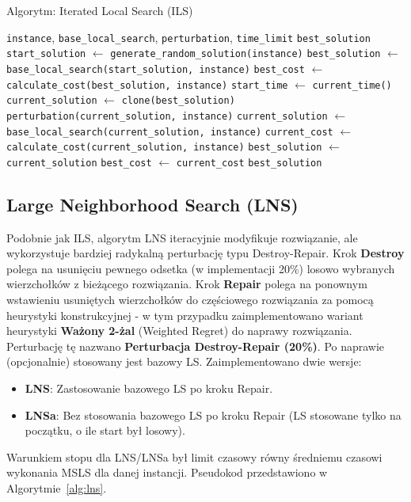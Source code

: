 \documentclass[12pt,a4paper]{article}
\begin{document}
\begin{algorithm}[H]
\caption{Algorytm: Iterated Local Search (ILS)}
\label{alg:ils}
\begin{algorithmic}[1]
\Require \texttt{instance}, \texttt{base\_local\_search}, \texttt{perturbation}, \texttt{time\_limit}
\Ensure \texttt{best\_solution}
\State \texttt{start\_solution} $\leftarrow$ \texttt{generate\_random\_solution(instance)}
\State \texttt{best\_solution} $\leftarrow$ \texttt{base\_local\_search(start\_solution, instance)}
\State \texttt{best\_cost} $\leftarrow$ \texttt{calculate\_cost(best\_solution, instance)}
\State \texttt{start\_time} $\leftarrow$ \texttt{current\_time()}
    \State \texttt{current\_solution} $\leftarrow$ \texttt{clone(best\_solution)}
    \State \texttt{perturbation(current\_solution, instance)}
    \State \texttt{current\_solution} $\leftarrow$ \texttt{base\_local\_search(current\_solution, instance)}
    \State \texttt{current\_cost} $\leftarrow$ \texttt{calculate\_cost(current\_solution, instance)}
        \State \texttt{best\_solution} $\leftarrow$ \texttt{current\_solution}
        \State \texttt{best\_cost} $\leftarrow$ \texttt{current\_cost}
    \EndIf
\EndWhile
\State \Return \texttt{best\_solution}
\end{algorithmic}
\end{algorithm}

\subsection{Large Neighborhood Search (LNS)}
Podobnie jak ILS, algorytm LNS iteracyjnie modyfikuje rozwiązanie, ale wykorzystuje bardziej radykalną perturbację typu Destroy-Repair. Krok \textbf{Destroy} polega na usunięciu pewnego odsetka (w implementacji 20\%) losowo wybranych wierzchołków z bieżącego rozwiązania. Krok \textbf{Repair} polega na ponownym wstawieniu usuniętych wierzchołków do częściowego rozwiązania za pomocą heurystyki konstrukcyjnej - w tym przypadku zaimplementowano wariant heurystyki \textbf{Ważony 2-żal} (Weighted Regret) do naprawy rozwiązania. Perturbację tę nazwano \textbf{Perturbacja Destroy-Repair (20\%)}. Po naprawie (opcjonalnie) stosowany jest bazowy LS. Zaimplementowano dwie wersje:
\begin{itemize}
    \item \textbf{LNS}: Zastosowanie bazowego LS po kroku Repair.
    \item \textbf{LNSa}: Bez stosowania bazowego LS po kroku Repair (LS stosowane tylko na początku, o ile start był losowy).
\end{itemize}
Warunkiem stopu dla LNS/LNSa był limit czasowy równy średniemu czasowi wykonania MSLS dla danej instancji. Pseudokod przedstawiono w Algorytmie~\ref{alg:lns}.
\end{document}
